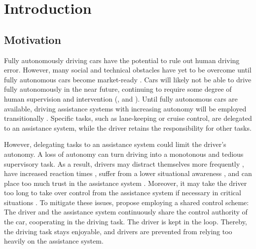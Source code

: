 \chapter{Introduction}
\label{sec:intro}

\section{Motivation}

Fully autonomously driving cars have the potential to rule out human driving error. However, many social and technical obstacles have yet to be overcome until fully autonomous cars become market-ready \parencite{autonomous_driving_book}. Cars will likely not be able to drive fully autonomously in the near future, continuing to require some degree of human supervision and intervention (\cite{human-needed}, and \cite{human-needed-2}). Until fully autonomous cars are available, driving assistance systems with increasing autonomy will be employed transitionally \parencite{autonomy-future}. Specific tasks, such as lane-keeping or cruise control, are delegated to an assistance system, while the driver retains the responsibility for other tasks.


However, delegating tasks to an assistance system could limit the driver's autonomy. A loss of autonomy can turn driving into a monotonous and tedious supervisory task. As a result, drivers may distract themselves more frequently \parencite{driver-distraction}, have increased reaction times \parencite{reaction-time}, suffer from a lower situational awareness \parencite{situational-awareness}, and can place too much trust in the assistance system \parencite{over-trust}. Moreover, it may take the driver too long to take over control from the assistance system if necessary in critical situations \parencite{takeover-time}. To mitigate these issues, \cite{shared-control-haptics} propose employing a shared control scheme: The driver and the assistance system continuously share the control authority of the car, cooperating in the driving task. The driver is kept in the loop. Thereby, the driving task stays enjoyable, and drivers are prevented from relying too heavily on the assistance system.

